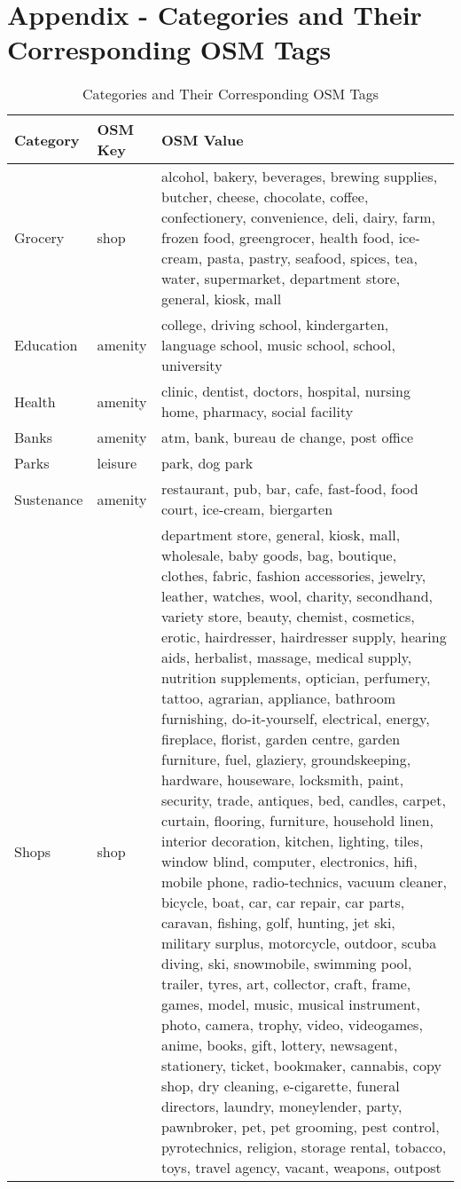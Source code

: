 \section{Appendix - Categories and Their Corresponding OSM Tags}
\label{app:categories_and_osm_tags}

\begin{table}[ht]
\centering
\caption{Categories and Their Corresponding OSM Tags}
\label{tab:categories}
\footnotesize
\begin{tabular}{|l|l|p{10cm}|}
\hline
\textbf{Category} & \textbf{OSM Key} & \textbf{OSM Value} \\ \hline
Grocery           & shop             & alcohol, bakery, beverages, brewing supplies, butcher, cheese, chocolate, coffee, confectionery, convenience, deli, dairy, farm, frozen food, greengrocer, health food, ice-cream, pasta, pastry, seafood, spices, tea, water, supermarket, department store, general, kiosk, mall \\ \hline
Education         & amenity          & college, driving school, kindergarten, language school, music school, school, university \\ \hline
Health            & amenity          & clinic, dentist, doctors, hospital, nursing home, pharmacy, social facility \\ \hline
Banks             & amenity          & atm, bank, bureau de change, post office \\ \hline
Parks             & leisure          & park, dog park \\ \hline
Sustenance        & amenity          & restaurant, pub, bar, cafe, fast-food, food court, ice-cream, biergarten \\ \hline
Shops             & shop             & department store, general, kiosk, mall, wholesale, baby goods, bag, boutique, clothes, fabric, fashion accessories, jewelry, leather, watches, wool, charity, secondhand, variety store, beauty, chemist, cosmetics, erotic, hairdresser, hairdresser supply, hearing aids, herbalist, massage, medical supply, nutrition supplements, optician, perfumery, tattoo, agrarian, appliance, bathroom furnishing, do-it-yourself, electrical, energy, fireplace, florist, garden centre, garden furniture, fuel, glaziery, groundskeeping, hardware, houseware, locksmith, paint, security, trade, antiques, bed, candles, carpet, curtain, flooring, furniture, household linen, interior decoration, kitchen, lighting, tiles, window blind, computer, electronics, hifi, mobile phone, radio-technics, vacuum cleaner, bicycle, boat, car, car repair, car parts, caravan, fishing, golf, hunting, jet ski, military surplus, motorcycle, outdoor, scuba diving, ski, snowmobile, swimming pool, trailer, tyres, art, collector, craft, frame, games, model, music, musical instrument, photo, camera, trophy, video, videogames, anime, books, gift, lottery, newsagent, stationery, ticket, bookmaker, cannabis, copy shop, dry cleaning, e-cigarette, funeral directors, laundry, moneylender, party, pawnbroker, pet, pet grooming, pest control, pyrotechnics, religion, storage rental, tobacco, toys, travel agency, vacant, weapons, outpost \\ \hline
\end{tabular}
\normalsize
\end{table}

